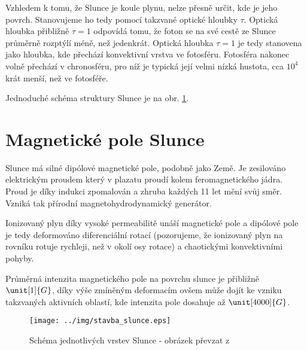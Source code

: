 Vzhledem k tomu, že Slunce je koule plynu, nelze přesně určit, kde je jeho povrch. Stanovujeme ho tedy pomocí takzvané optické hloubky $\tau$. Optická hloubka přibližně $\tau=1$ odpovídá tomu, že foton se na své cestě ze Slunce průměrně rozptýlí méně, než jedenkrát. Optická hloubka $\tau=1$ je tedy stanovena jako hloubka, kde přechází konvektivní vrstva ve fotosféru. Fotosféra nakonec volně přechází v chronosféru, pro níž je typická její velmi nízká hustota, cca $10^4$krát menší, než ve fotosféře.

Jednoduché schéma struktury Slunce je na obr. \ref{fig:stavba}.

\section{Magnetické pole Slunce}
Slunce má silné dipólové magnetické pole, podobně jako Země. Je zesilováno elektrickým proudem který v plazatu proudí kolem feromagnetického jádra. Proud je díky indukci zpomalován a zhruba každých 11 let mění svůj směr. Vzniká tak přírodní magnetohydrodynamický generátor.

Ionizovaný plyn díky vysoké permeabilitě unáší magnetické pole a dipólové pole je tedy deformováno diferenciální rotací (pozorujeme, že ionizovaný plyn na rovníku rotuje rychleji, než v okolí osy rotace) a chaotickými konvektivními pohyby.

Průměrná intenzita magnetického pole na povrchu slunce je přibližně $\unit[1]{G}$, díky výše zmíněným deformacím ovšem může dojít ke vzniku takzvaných aktivních oblastí, kde intenzita pole dosahuje až $\unit[4000]{G}$.

\begin{figure}[h!]
	\centering
	\texttt{[image: ../img/stavba\_slunce.eps]}
	\caption{Schéma jednotlivých vrstev Slunce - obrázek převzat z~\cite{astro_hvezda}}
	\label{fig:stavba}
\end{figure}